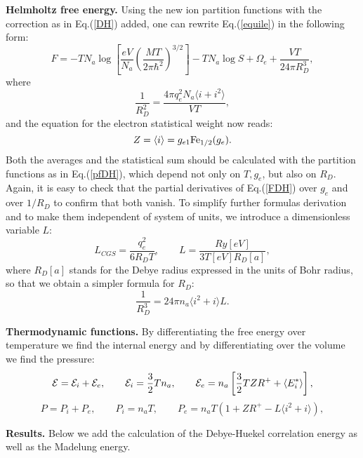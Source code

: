 {\bf Helmholtz free energy.}
Using the new ion partition functions with the correction as in Eq.(\ref{DH}) added,
one can rewrite Eq.(\ref{equile}) in the following form:
\begin{equation}\label{FDH}
F = -TN_a\log\left[\frac{eV}{N_a}\left(\frac{MT}{2\pi \hbar^2}\right)^{3/2}\right]-TN_a\log S +\Omega_e +\frac{VT}{24\pi R_D^3}, 
\end{equation}
where
\begin{equation}\label{RDdef}
\frac1{R_D^2} = \frac{4\pi q_e^2N_a\langle i+i^2\rangle}{VT},
\end{equation}
and the equation for the electron statistical weight now reads:
\begin{equation}
Z=\langle i\rangle=g_{e1}{\rm Fe}_{1/2}(g_e).
\end{equation}
Both the averages and the statistical sum
should be calculated with the partition functions as in
Eq.(\ref{pfDH}), which depend not only on $T,g_e$, but also on $R_D$.
Again, it is easy to check that the partial derivatives of
Eq.(\ref{FDH}) over $g_e$ and over $1/R_D$ to confirm that
 both vanish.
To simplify further formulas derivation and to make them independent of system of units,
we introduce a dimensionless variable $L$:
\begin{equation}
L_{CGS} = \frac{q_e^2}{6 R_D T},\qquad
L = \frac{Ry[eV]}{3 T[eV] R_D[a]},
\end{equation}
where $R_D[a]$ stands for the Debye radius expressed in the units of Bohr radius,
so that we obtain a simpler formula for $R_D$:
\begin{equation}
\frac{1}{R_D^3} = 24 \pi n_a \langle i^2+i \rangle L.
\end{equation}

{\bf Thermodynamic functions.}
By differentiating the free energy over temperature we find the internal energy and by differentiating over the volume we find the pressure:
\begin{equation}\label{EDH}
{\cal E}={\cal E}_i + {\cal E}_e, \qquad
{\cal E}_i = \frac32 Tn_a, \qquad
{\cal E}_e = n_a \left[ \frac32 TZR^+ + \langle E^*_i\rangle \right],
\end{equation}
\begin{equation}\label{PDH}
P = P_i+P_e, \qquad
P_i = n_a T, \qquad
P_e = n_a T (1 + ZR^+ - L \langle i^2+i \rangle),
\end{equation}

{\bf Results.}
Below we add the calculation of the Debye-Huekel correlation energy as well as the Madelung energy.
\begin{center}
 
\par\end{center}

